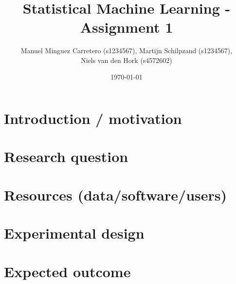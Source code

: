 \documentclass[12pt]{article}
\newcommand{\sect}[1]{\section{#1} \label{#1} }
\begin{document}
\title{Statistical Machine Learning - Assignment 1}
\author{
Manuel Minguez Carretero (s1234567), Martijn Schilpzand (s1234567),\\ Niels van den Hork (s4572602)}
\date{\today}


\maketitle



\sect{    Introduction / motivation}


\sect{    Research question}


\sect{    Resources (data/software/users)}


\sect{    Experimental design}


\sect{    Expected outcome}
\end{document}
